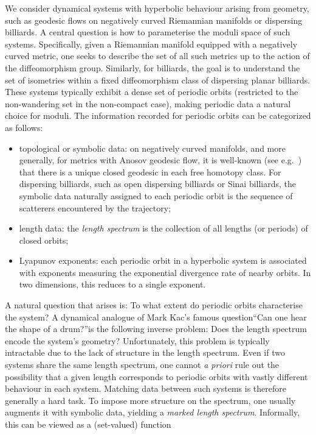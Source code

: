 \documentclass[reqno,11pt]{amsart}
\begin{document}
We consider dynamical systems with hyperbolic behaviour arising from geometry, such as geodesic flows on negatively curved Riemannian manifolds or dispersing billiards. A central question is how to parameterise the moduli space of such systems. Specifically, given a Riemannian manifold equipped with a negatively curved metric, one seeks to describe the set of all such metrics up to the action of the diffeomorphism group. Similarly, for billiards, the goal is to understand the set of isometries within a fixed diffeomorphism class of dispersing planar billiards.
These systems typically exhibit a dense set of periodic orbits (restricted to the non-wandering set in the non-compact case), making periodic data a natural choice for moduli. The information recorded for periodic orbits can be categorized as follows:
\begin{itemize}
    \item topological or symbolic data: on negatively curved manifolds, and more generally, for metrics with Anosov geodesic flow, it is well-known (see e.g.~\cite{klingenberg_riemannian_1974}) that there is a unique closed geodesic in each free homotopy class. For dispersing billiards, such as open dispersing billiards or Sinai billiards, the symbolic data naturally assigned to each periodic orbit is the sequence of scatterers encountered by the trajectory;
    \item length data: the \emph{length spectrum} is the collection of all lengths (or periods) of closed orbits;  
    \item Lyapunov exponents: each periodic orbit in a hyperbolic system is associated with exponents measuring the exponential divergence rate of nearby orbits. In two dimensions, this reduces to a single exponent.
\end{itemize}
A natural question that arises is: To what extent do periodic orbits characterise the system?
A dynamical analogue of Mark Kac’s famous question\textemdash ``Can one hear the shape of a drum?''\textemdash is the following inverse problem: Does the length spectrum encode the system’s geometry?
Unfortunately, this problem is typically intractable due to the lack of structure in the length spectrum. Even if two systems share the same length spectrum, one cannot \textit{a priori} rule out the possibility that a given length corresponds to periodic orbits with vastly different behaviour in each system. Matching data between such systems is therefore generally a hard task. 
To impose more structure on the spectrum, one usually augments it with symbolic data, yielding a \emph{marked length spectrum}. Informally, this can be viewed as a (set-valued) function
\end{document}
